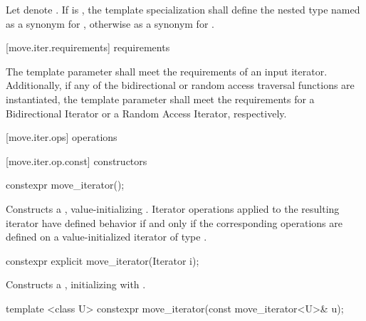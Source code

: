 \pnum
Let  denote .
If  is ,
the template specialization  shall define
the nested type named  as a synonym for
,
otherwise as a synonym for .

[move.iter.requirements]{ requirements}

\pnum
The template parameter  shall meet
the requirements of an input iterator.
Additionally, if any of the bidirectional or random access traversal
functions are instantiated, the template parameter shall meet the
requirements for a Bidirectional Iterator
or a Random Access Iterator, respectively.

[move.iter.ops]{ operations}

[move.iter.op.const]{ constructors}

%
\begin{itemdecl}
constexpr move_iterator();
\end{itemdecl}

\begin{itemdescr}
\pnum
\effects Constructs a , value-initializing
. Iterator operations applied to the resulting
iterator have defined behavior if and only if the corresponding operations are defined
on a value-initialized iterator of type .
\end{itemdescr}


%
\begin{itemdecl}
constexpr explicit move_iterator(Iterator i);
\end{itemdecl}

\begin{itemdescr}
\pnum
\effects Constructs a , initializing
 with .
\end{itemdescr}


%
\begin{itemdecl}
template <class U> constexpr move_iterator(const move_iterator<U>& u);
\end{itemdecl}

